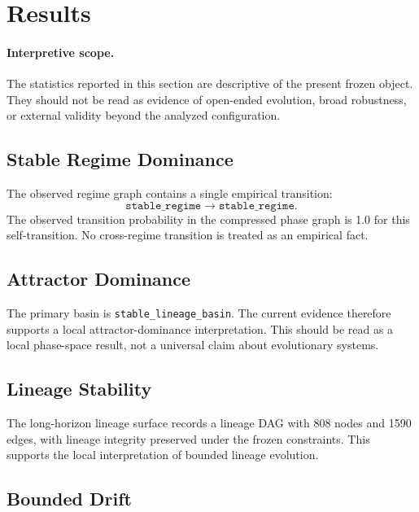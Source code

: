 \section{Results}

\paragraph{Interpretive scope.}
The statistics reported in this section are descriptive of the present frozen
object. They should not be read as evidence of open-ended evolution, broad
robustness, or external validity beyond the analyzed configuration.

\subsection{Stable Regime Dominance}

The observed regime graph contains a single empirical transition:
\[
\texttt{stable\_regime} \rightarrow \texttt{stable\_regime}.
\]
The observed transition probability in the compressed phase graph is 1.0 for
this self-transition. No cross-regime transition is treated as an empirical
fact.



\subsection{Attractor Dominance}

The primary basin is \texttt{stable\_lineage\_basin}. The current evidence
therefore supports a local attractor-dominance interpretation. This should be
read as a local phase-space result, not a universal claim about evolutionary
systems.



\subsection{Lineage Stability}

The long-horizon lineage surface records a lineage DAG with 808 nodes and 1590
edges, with lineage integrity preserved under the frozen constraints. This
supports the local interpretation of bounded lineage evolution.



\subsection{Bounded Drift}

